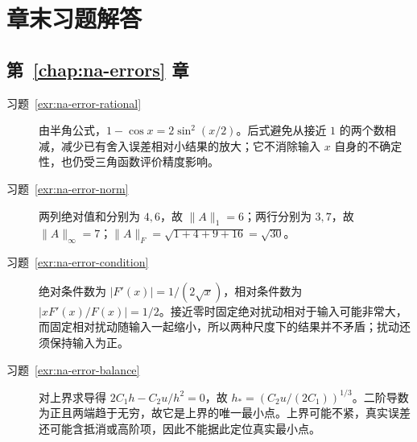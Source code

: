\setcounter{chapter}{0} %
\chapter{章末习题解答}
\label{app:na-solutions}

\section{第~\ref{chap:na-errors} 章}
\begin{description}
\item[习题~\ref{exr:na-error-rational}] 由半角公式，$1-\cos x=2\sin^2(x/2)$。后式避免从接近 $1$ 的两个数相减，减少已有舍入误差相对小结果的放大；它不消除输入 $x$ 自身的不确定性，也仍受三角函数评价精度影响。
\item[习题~\ref{exr:na-error-norm}] 两列绝对值和分别为 $4,6$，故 $\|A\|_1=6$；两行分别为 $3,7$，故 $\|A\|_\infty=7$；$\|A\|_F=\sqrt{1+4+9+16}=\sqrt{30}$。
\item[习题~\ref{exr:na-error-condition}] 绝对条件数为 $|F'(x)|=1/(2\sqrt x)$，相对条件数为 $|xF'(x)/F(x)|=1/2$。接近零时固定绝对扰动相对于输入可能非常大，而固定相对扰动随输入一起缩小，所以两种尺度下的结果并不矛盾；扰动还须保持输入为正。
\item[习题~\ref{exr:na-error-balance}] 对上界求导得 $2C_1h-C_2u/h^2=0$，故 $h_*=(C_2u/(2C_1))^{1/3}$。二阶导数为正且两端趋于无穷，故它是上界的唯一最小点。上界可能不紧，真实误差还可能含抵消或高阶项，因此不能据此定位真实最小点。
\end{description}

